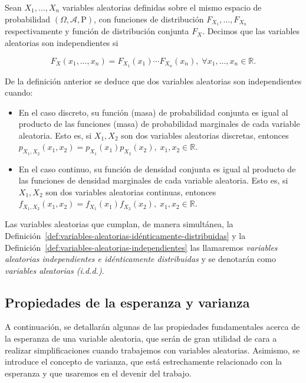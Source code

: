 \begin{definicion}\label{def:variables-aleatorias-independientes}
    Sean $X_1, \ldots, X_n$ variables aleatorias definidas sobre el mismo espacio de probabilidad $(\Omega, \mathcal{A}, \mathrm{P})$, con funciones de distribución $F_{X_1}, \ldots, F_{X_n}$ respectivamente y función de distribución conjunta $F_{X}$. Decimos que las variables aleatorias son independientes si

    \[ F_X(x_1, \ldots, x_n) = F_{X_1}(x_1) \cdots F_{X_n}(x_n), \; \forall x_1, \ldots, x_n \in \mathbb{R}. \]
\end{definicion}

\begin{observacion}
    De la definición anterior se deduce que dos variables aleatorias son independientes cuando:
    \begin{itemize}
        \item En el caso discreto, su función (masa) de probabilidad conjunta es igual al producto de las funciones (masa) de probabilidad marginales de cada variable aleatoria. Esto es, si $X_1, X_2$ son dos variables aleatorias discretas, entonces $p_{X_1, X_2}(x_1, x_2) = p_{X_1}(x_1)p_{X_2}(x_2), \; x_1, x_2 \in \mathbb{R}$.
        \item En el caso continuo, su función de densidad conjunta es igual al producto de las funciones de densidad marginales de cada variable aleatoria. Esto es, si $X_1, X_2$ son dos variables aleatorias continuas, entonces $f_{X_1, X_2}(x_1, x_2) = f_{X_1}(x_1)f_{X_2}(x_2), \; x_1, x_2 \in \mathbb{R}$.
    \end{itemize}
\end{observacion}

\begin{definicion}
    Las variables aleatorias que cumplan, de manera simultánea, la Definición~\ref{def:variables-aleatorias-idénticamente-distribuidas} y la Definición~\ref{def:variables-aleatorias-independientes} las llamaremos \emph{variables aleatorias independientes e idénticamente distribuidas} y se denotarán como \emph{variables aleatorias (i.d.d.)}.
\end{definicion}

\subsection{Propiedades de la esperanza y varianza}
A continuación, se detallarán algunas de las propiedades fundamentales acerca de la esperanza de una variable aleatoria, que serán de gran utilidad de cara a realizar simplificaciones cuando trabajemos con variables aleatorias. Asimismo, se introduce el concepto de varianza, que está estrechamente relacionado con la esperanza y que usaremos en el devenir del trabajo.

